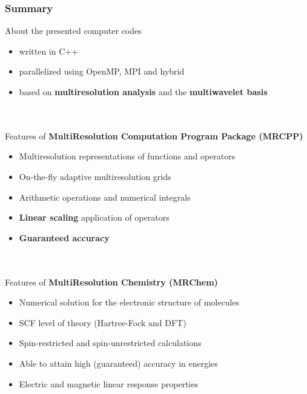 \begin{frame}
    \frametitle{Summary}
    About the presented computer codes
    \begin{itemize}
        \item   written in C++
        \item   parallelized using OpenMP, MPI and hybrid
        \item   based on \textbf{multiresolution analysis} and the \textbf{multiwavelet basis}
    \end{itemize}
    \ \\
    \ \\
    \pause
    Features of \textbf{MultiResolution Computation Program Package (MRCPP)}
    \begin{itemize}
        \item   Multiresolution representations of functions and operators
        \item   On-the-fly adaptive multiresolution grids
        \item   Arithmetic operations and numerical integrals
        \item   \textbf{Linear scaling} application of operators
        \item   \textbf{Guaranteed accuracy}
    \end{itemize}
    \ \\
    \ \\
    \pause
    Features of \textbf{MultiResolution Chemistry (MRChem)}
    \begin{itemize}
        \item   Numerical solution for the electronic structure of molecules
        \item   SCF level of theory (Hartree-Fock and DFT)
        \item   Spin-restricted and spin-unrestricted calculations
        \item   Able to attain high (guaranteed) accuracy in energies
	\item	Electric and magnetic linear response properties
    \end{itemize}
\end{frame}

